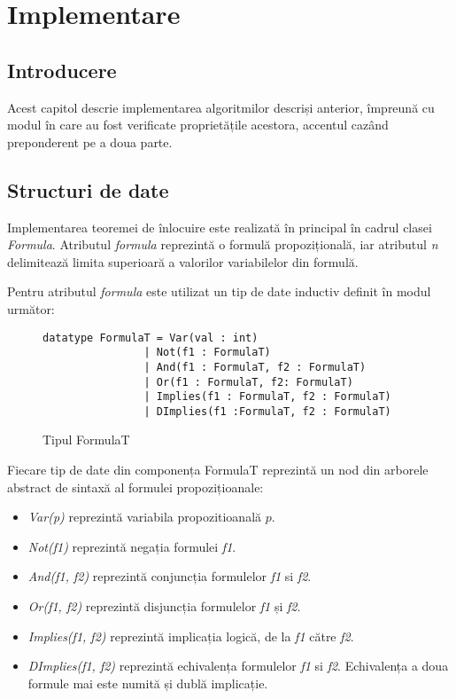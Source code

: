 \chapter{Implementare}

\section{Introducere}

Acest capitol descrie implementarea algoritmilor descriși anterior, împreună cu modul în care au fost verificate proprietățile acestora, accentul cazând preponderent pe a doua parte.

\section{Structuri de date}

Implementarea teoremei de înlocuire este realizată în principal în cadrul clasei \textit{Formula}. Atributul \textit{formula} reprezintă o formulă propozițională, iar atributul \textit{n} delimitează limita superioară a valorilor variabilelor din formulă.

Pentru atributul \textit{formula} este utilizat un tip de date inductiv definit în modul următor:
\begin{figure}[H]
    \caption{Tipul FormulaT}
    \label{Tipul FormulaT}

\begin{Verbatim}[fontsize=\small, frame=single,baselinestretch=0.1]
datatype FormulaT = Var(val : int)
                | Not(f1 : FormulaT)
                | And(f1 : FormulaT, f2 : FormulaT)
                | Or(f1 : FormulaT, f2: FormulaT)
                | Implies(f1 : FormulaT, f2 : FormulaT)
                | DImplies(f1 :FormulaT, f2 : FormulaT)
\end{Verbatim}

\end{figure}
Fiecare tip de date din componența FormulaT reprezintă un nod din arborele abstract de sintaxă al formulei propozițioanale:

\begin{itemize}
	\item \textit{Var(p)} reprezintă variabila propozitioanală $p$.
	\item \textit{Not(f1)} reprezintă negația formulei \textit{f1}.
	\item \textit{And(f1, f2)} reprezintă conjuncția formulelor \textit{f1} si \textit{f2}.
	\item \textit{Or(f1, f2)} reprezintă disjuncția formulelor \textit{f1} și \textit{f2}.
	\item \textit{Implies(f1, f2)} reprezintă implicația logică, de la \textit{f1} către \textit{f2}.
	\item \textit{DImplies(f1, f2)} reprezintă echivalența formulelor \textit{f1} si \textit{f2}. Echivalența a doua formule mai este numită și dublă implicație.
\end{itemize}

